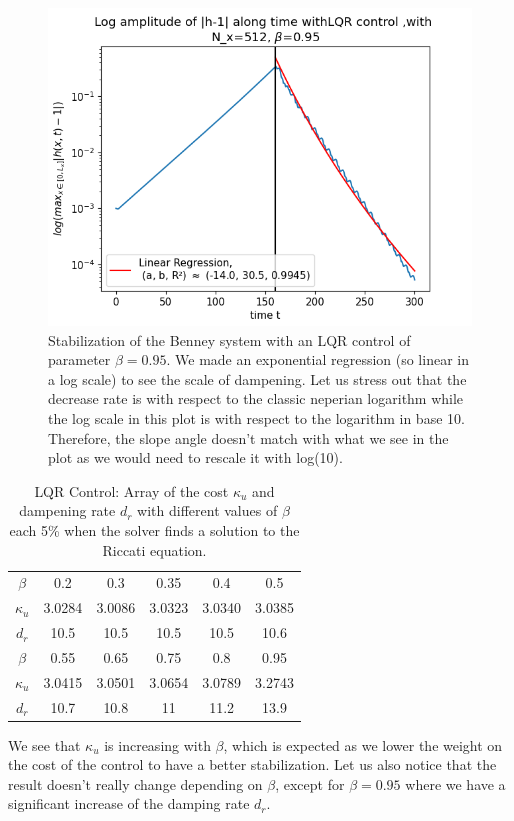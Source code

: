 \documentclass[12pt]{article}
\begin{document}
\begin{figure}
    \centering
    \includegraphics[width=0.6\linewidth]{Control_experiments/LQR_beta_0.95.png}
    \caption{Stabilization of the Benney system with an LQR control of parameter $\beta=0.95$.
    We made an exponential regression (so linear in a log scale) to see the scale of dampening.
    Let us stress out that the decrease rate is with respect to the classic neperian logarithm
    while the log scale in this plot is with respect to the logarithm in base 10. Therefore,
    the slope angle doesn't match with what we see in the plot as we would need to rescale it with log(10). }
    \label{fig:LQR_beta_0.95}
\end{figure}
\vspace{0.5cm}


\begin{table}[ht]
    \caption{LQR Control: Array of the cost $\kappa_u$ and dampening rate $d_r$ with different values of $\beta$ each 5\%
    when the solver finds a solution to the Riccati equation.}
    \label{tab:LQR_cost_beta}
    \centering
        \begin{tabular}{ |c|c|c|c|c|c| }
        \hline
        $\beta$ & 0.2 & 0.3 & 0.35 & 0.4 & 0.5 \\
        $\kappa_u$ & 3.0284 & 3.0086 & 3.0323 & 3.0340 &3.0385 \\ 
        $d_r$ & 10.5 & 10.5 & 10.5 & 10.5 & 10.6\\
        \hline
        $\beta$ & 0.55 & 0.65 & 0.75 & 0.8 & 0.95 \\
        $\kappa_u$ & 3.0415 & 3.0501 & 3.0654 & 3.0789 &3.2743 \\ 
        $d_r$ & 10.7 & 10.8 & 11 & 11.2 & 13.9\\
        \hline
        \end{tabular}
\end{table}




We see that $\kappa_u$ is increasing with $\beta$, which is expected as we lower the weight
on the cost of the control to have a better stabilization. Let us also notice that the result
doesn't really change depending on $\beta$, except for $\beta = 0.95$ where we have a significant
increase of the damping rate $d_r$.\\
\end{document}
